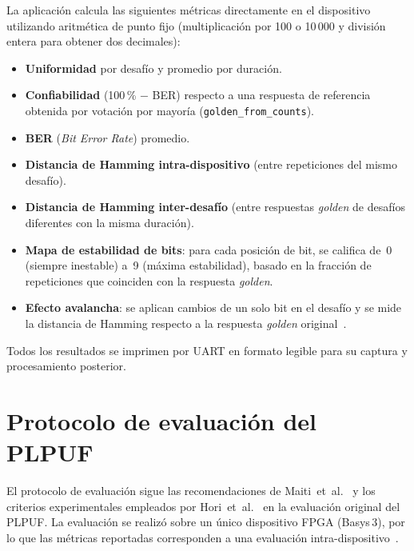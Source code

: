 La aplicación calcula las siguientes métricas directamente en el dispositivo
utilizando aritmética de punto fijo (multiplicación por 100 o 10\,000 y
división entera para obtener dos decimales):

\begin{itemize}
  \item \textbf{Uniformidad} por desafío y promedio por duración.
  \item \textbf{Confiabilidad} (100\,\% $-$ BER) respecto a una respuesta de
    referencia obtenida por votación por mayoría
    (\texttt{golden\_from\_counts}).
  \item \textbf{BER} (\textit{Bit Error Rate}) promedio.
  \item \textbf{Distancia de Hamming intra-dispositivo} (entre repeticiones
    del mismo desafío).
  \item \textbf{Distancia de Hamming inter-desafío} (entre respuestas
    \textit{golden} de desafíos diferentes con la misma duración).
  \item \textbf{Mapa de estabilidad de bits}: para cada posición de bit, se
    califica de~0 (siempre inestable) a~9 (máxima estabilidad), basado en la
    fracción de repeticiones que coinciden con la respuesta \textit{golden}.
  \item \textbf{Efecto avalancha}: se aplican cambios de un solo bit en el
    desafío y se mide la distancia de Hamming respecto a la respuesta
    \textit{golden} original~\cite{maiti_2012_systematic}.
\end{itemize}

Todos los resultados se imprimen por UART en formato legible para su captura
y procesamiento posterior.

\section{Protocolo de evaluación del PLPUF}
\label{sec:protocolo}

El protocolo de evaluación sigue las recomendaciones de
Maiti~et~al.~\cite{maiti_2012_systematic} y los criterios experimentales
empleados por Hori~et~al.~\cite{hori_2011_pseudolfsr} en la evaluación
original del PLPUF. La evaluación se realizó sobre un único dispositivo FPGA
(Basys\,3), por lo que las métricas reportadas corresponden a una evaluación
intra-dispositivo~\cite{wilde_2020_confidence}.

